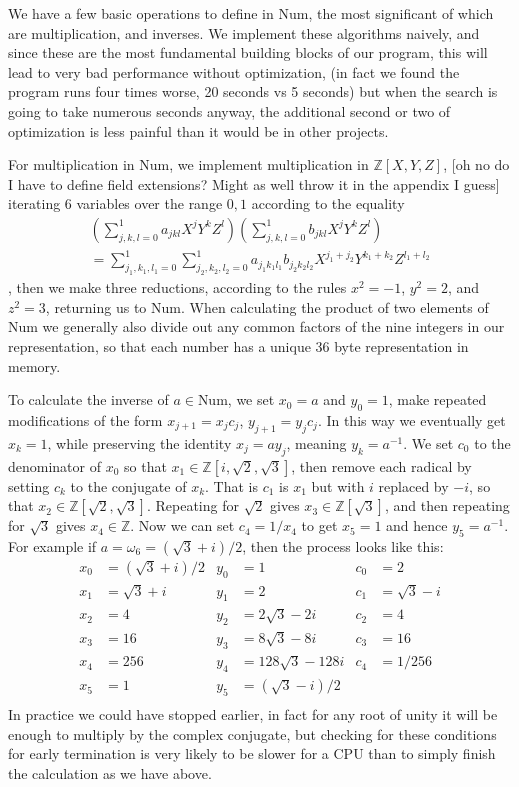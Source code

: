 We have a few basic operations to define in Num, the most significant of which are multiplication, and inverses. We implement these algorithms naively, and since these are the most fundamental building blocks of our program, this will lead to very bad performance without optimization, (in fact we found the program runs four times worse, 20 seconds vs 5 seconds) but when the search is going to take numerous seconds anyway, the additional second or two of optimization is less painful than it would be in other projects.

For multiplication in Num, we implement multiplication in $\mathbb{Z}[X, Y, Z]$, [oh no do I have to define field extensions? Might as well throw it in the appendix I guess] iterating 6 variables over the range ${0, 1}$ according to the equality
\begin{align*}
	\left(\sum_{j,k,l = 0}^1 a_{jkl}X^jY^kZ^l\right)\left(\sum_{j,k,l = 0}^1 b_{jkl}X^jY^kZ^l\right)
	\\= \sum_{j_1,k_1,l_1=0}^1\sum_{j_2,k_2,l_2=0}^1 a_{j_1k_1l_1}b_{j_2k_2l_2}X^{j_1+j_2}Y^{k_1+k_2}Z^{l_1+l_2}
\end{align*}
, then we make three reductions, according to the rules $x^2 = -1$, $y^2 = 2$, and $z^2 = 3$, returning us to Num. When calculating the product of two elements of Num we generally also divide out any common factors of the nine integers in our representation, so that each number has a unique 36 byte representation in memory.

To calculate the inverse of $a \in \text{Num}$, we set $x_0 = a$ and $y_0 = 1$, make repeated modifications of the form $x_{j+1} = x_jc_j$, $y_{j+1} = y_jc_j$. In this way we eventually get $x_k = 1$, while preserving the identity $x_j = ay_j$, meaning $y_k = a^{-1}$. We set $c_0$ to the denominator of $x_0$ so that $x_1 \in \mathbb{Z}[i, \sqrt{2}, \sqrt{3}]$, then remove each radical by setting $c_k$ to the conjugate of $x_k$. That is $c_1$ is $x_1$ but with $i$ replaced by $-i$, so that $x_2 \in \mathbb{Z}[\sqrt{2}, \sqrt{3}]$. Repeating for $\sqrt{2}$ gives $x_3 \in \mathbb{Z}[\sqrt{3}]$, and then repeating for $\sqrt{3}$ gives $x_4 \in \mathbb{Z}$. Now we can set $c_4 = 1/x_4$ to get $x_5 = 1$ and hence $y_5 = a^{-1}$. For example if $a = \omega_{6} = (\sqrt{3} + i)/2$, then the process looks like this:
\begin{align*}
	x_0 &= (\sqrt{3} + i)/2 & y_0 &= 1 & c_0 &= 2 \\
	x_1 &= \sqrt{3} + i & y_1 &= 2 & c_1 &= \sqrt{3}-i \\
	x_2 &= 4 & y_2 &= 2\sqrt{3}-2i & c_2 &= 4 \\
	x_3 &= 16 & y_3 &= 8\sqrt{3}-8i & c_3 &= 16 \\
	x_4 &= 256 & y_4 &= 128\sqrt{3}-128i & c_4 &= 1/256 \\
	x_5 &= 1 & y_5 &= (\sqrt{3}-i)/2 & \\
\end{align*}
In practice we could have stopped earlier, in fact for any root of unity it will be enough to multiply by the complex conjugate, but checking for these conditions for early termination is very likely to be slower for a CPU than to simply finish the calculation as we have above.

